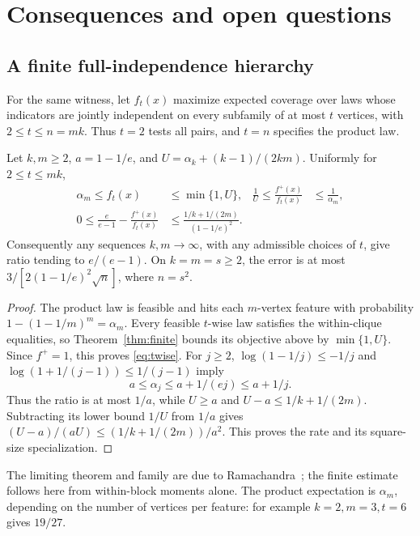 \section{Consequences and open questions}\label{sec:consequences}
\subsection{A finite full-independence hierarchy}\label{sec:twise}
For the same witness, let \(f_t(x)\) maximize expected coverage over laws
whose indicators are jointly independent on every subfamily of at most
\(t\) vertices, with \(2\leq t\leq n=mk\). Thus \(t=2\) tests all pairs,
and \(t=n\) specifies the product law.

\begin{corollary}\label{cor:twise}
Let \(k,m\geq2\), \(a=1-1/e\), and
\(U=\alpha_k+(k-1)/(2km)\). Uniformly for \(2\leq t\leq mk\),
\begin{align}
 \alpha_m\leq f_t(x)&\leq\min\{1,U\},&
 \frac1U\leq\frac{f^+(x)}{f_t(x)}&\leq\frac1{\alpha_m},\label{eq:twise}\\
 0\leq\frac e{e-1}-\frac{f^+(x)}{f_t(x)}
 &\leq\frac{1/k+1/(2m)}{(1-1/e)^2}.\label{eq:rate}
\end{align}
Consequently any sequences \(k,m\to\infty\), with any admissible choices
of \(t\), give ratio tending to \(e/(e-1)\). On \(k=m=s\geq2\), the
error is at most \(3/[2(1-1/e)^2\sqrt n]\), where \(n=s^2\).
\end{corollary}
\begin{proof}
The product law is feasible and hits each \(m\)-vertex feature with
probability \(1-(1-1/m)^m=\alpha_m\). Every feasible \(t\)-wise law
satisfies the within-clique equalities, so Theorem~\ref{thm:finite} bounds
its objective above by \(\min\{1,U\}\). Since \(f^+=1\), this proves
\eqref{eq:twise}. For \(j\geq2\), \(\log(1-1/j)\leq-1/j\) and
\(\log(1+1/(j-1))\leq1/(j-1)\) imply
\[
 a\leq\alpha_j\leq a+1/(ej)\leq a+1/j.
\]
Thus the ratio is at most \(1/a\), while \(U\geq a\) and
\(U-a\leq1/k+1/(2m)\). Subtracting its lower bound \(1/U\) from
\(1/a\) gives
\((U-a)/(aU)\leq(1/k+1/(2m))/a^2\). This proves the rate and its
square-size specialization.
\end{proof}

The limiting theorem and family are due to Ramachandra~\cite{Ramachandra2026};
the finite estimate follows here from within-block moments alone.
The product expectation is \(\alpha_m\), depending on the number of
vertices per feature: for example \(k=2,m=3,t=6\) gives \(19/27\).

